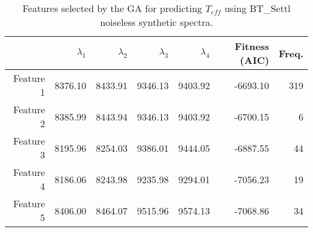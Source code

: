 \begin{table}
\begin{center}
\begin{tabular}{rrrrrrr}
  \hline
 & $\lambda_1$ & $\lambda_2$ & $\lambda_3$ & $\lambda_4 $ & Fitness (AIC) & Freq. \\ 
  \hline
Feature 1 & 8376.10 & 8433.91 & 9346.13 & 9403.92 & -6693.10 & 319 \\ 
Feature 2 & 8385.99 & 8443.94 & 9346.13 & 9403.92 & -6700.15 &   6 \\ 
Feature 3 & 8195.96 & 8254.03 & 9386.01 & 9444.05 & -6887.55 &  44 \\ 
Feature 4 & 8186.06 & 8243.98 & 9235.98 & 9294.01 & -7056.23 &  19 \\ 
Feature 5 & 8406.00 & 8464.07 & 9515.96 & 9574.13 & -7068.86 &  34 \\ 
   \hline
\end{tabular}
\caption {Features selected by the GA for predicting $T_{eff}$ 
      using BT\_Settl noiseless synthetic
      spectra. } \label{tab:tab_NC_T}
\end{center}
\end{table}

